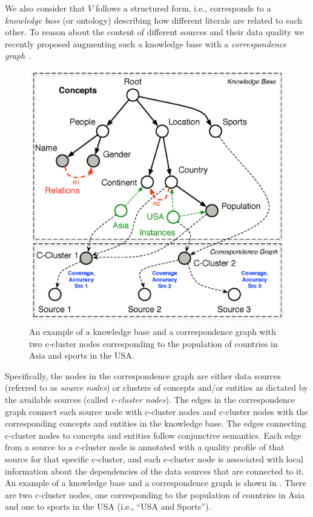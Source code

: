 \documentclass{vldb}
\begin{document}
We also consider that $V$ follows a structured form, i.e., corresponds to a {\em knowledge base} (or ontology) describing how different literals are related to each other. To reason about the content of different sources and their data quality we recently proposed augmenting such a knowledge base with a {\em correspondence graph}~\cite{rekatsinas:2015}. 
\begin{figure}[h]
	\begin{center}
	\includegraphics[clip,scale=0.25]{fig/kgcg}
	\caption{An example of a knowledge base and a correspondence graph with two c-cluster nodes corresponding to the population of countries in Asia and sports in the USA.}
	\label{fig:kgcg}
	\vspace{-10pt}
	\end{center}
\end{figure}

Specifically, the nodes in the correspondence graph are either data sources (referred to as {\em source nodes}) or clusters of concepts and/or entities as dictated by the available sources (called {\em c-cluster nodes}). The edges in the correspondence graph connect each source node with c-cluster nodes and c-cluster nodes with the corresponding concepts and entities in the knowledge base.  The edges connecting c-cluster nodes to concepts and entities follow conjunctive semantics. Each edge from a source to a c-cluster node is annotated with a quality profile of that source for that specific c-cluster, and each c-cluster node is associated with local information about the dependencies of the data sources that are connected to it. An example of a knowledge base and a correspondence graph is shown in . There are two c-cluster nodes, one corresponding to the population of countries in Asia and one to sports in the USA (i.e., ``USA and Sports''). 
\end{document}
